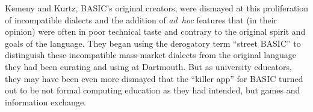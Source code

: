 Kemeny and Kurtz, BASIC's original creators, were dismayed at this
proliferation of incompatible dialects and the addition of
\emph{ad~hoc} features that (in their opinion) were often in poor
technical taste and contrary to the original spirit and goals of the
language.
They began using the derogatory term ``street BASIC'' to distinguish
these incompatible mass-market dialects from the original language
they had been curating and using at Dartmouth.
But as university educators, they may have been even more dismayed
that the ``killer app'' for BASIC turned out to be not formal
computing education as they had intended, but games and information exchange.



